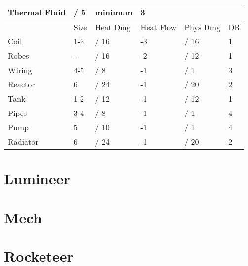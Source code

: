 \documentclass[a4paper]{article}
\begin{document}
\begin{tabular}{|l l l l l l|}
\midrule
Thermal Fluid & \hspace{1cm} / 5 & minimum & 3 & & \\
\midrule
& Size & Heat Dmg & Heat Flow & Phys Dmg & DR \\
\midrule
Coil & 1-3 & \hspace{1cm} / 16 & -3 & \hspace{1cm} / 16 & 1 \\
Robes & - & \hspace{1cm} / 16 & -2 & \hspace{1cm} / 12 & 1 \\
Wiring & 4-5 & \hspace{1cm} / 8 & -1 & \hspace{1cm} / 1 & 3 \\
Reactor & 6 & \hspace{1cm} / 24 & -1 & \hspace{1cm} / 20 & 2 \\
\midrule
Tank & 1-2 & \hspace{1cm} / 12 & -1 & \hspace{1cm} / 12 & 1 \\
Pipes & 3-4 & \hspace{1cm} / 8 & -1 & \hspace{1cm} / 1 & 4 \\
Pump & 5 & \hspace{1cm} / 10 & -1 & \hspace{1cm} / 1 & 4 \\
Radiator & 6 & \hspace{1cm} / 24 & -1 & \hspace{1cm} / 20 & 2 \\
\bottomrule
\end{tabular} \label{table:arcmage_sheet}









\section{Lumineer}

\section{Mech}

\section{Rocketeer}
\end{document}
